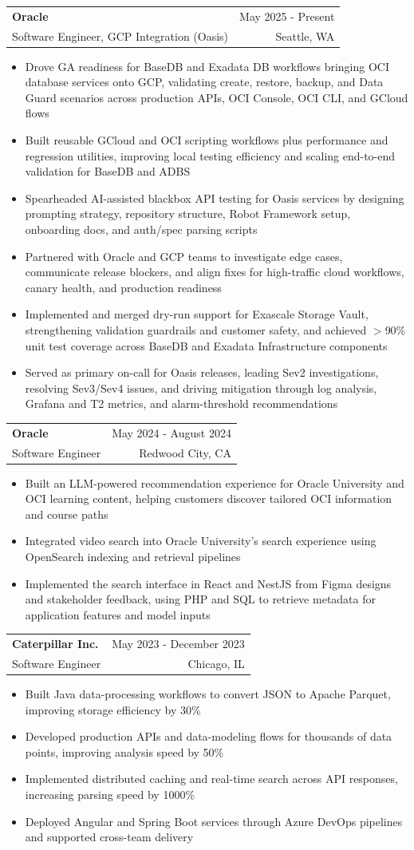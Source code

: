 \documentclass[letterpaper,11pt]{article}
\makeatletter
\newcommand{\resumeItem}[1]{
  \item\small{
    {#1 \vspace{-2pt}}
  }
}
\newcommand{\resumeSubheading}[4]{
  \vspace{-2pt}\item
    \begin{tabular*}{0.97\textwidth}[t]{l@{\extracolsep{\fill}}r}
      \textbf{#1} & #2 \\
      {\small#3} & {\small #4} \\
    \end{tabular*}\vspace{-7pt}
}
\newcommand{\resumeItemListStart}{\begin{itemize}}
\newcommand{\resumeItemListEnd}{\end{itemize}\vspace{-5pt}}
\makeatother
\begin{document}
    \resumeSubheading
  {Oracle}{May 2025 - Present}
  {Software Engineer, GCP Integration (Oasis)}{Seattle, WA}
  \resumeItemListStart
    \resumeItem{Drove GA readiness for BaseDB and Exadata DB workflows bringing OCI database services onto GCP, validating create, restore, backup, and Data Guard scenarios across production APIs, OCI Console, OCI CLI, and GCloud flows}
    \resumeItem{Built reusable GCloud and OCI scripting workflows plus performance and regression utilities, improving local testing efficiency and scaling end-to-end validation for BaseDB and ADBS}
    \resumeItem{Spearheaded AI-assisted blackbox API testing for Oasis services by designing prompting strategy, repository structure, Robot Framework setup, onboarding docs, and auth/spec parsing scripts}
    \resumeItem{Partnered with Oracle and GCP teams to investigate edge cases, communicate release blockers, and align fixes for high-traffic cloud workflows, canary health, and production readiness}
    \resumeItem{Implemented and merged dry-run support for Exascale Storage Vault, strengthening validation guardrails and customer safety, and achieved $>$90\% unit test coverage across BaseDB and Exadata Infrastructure components}
    \resumeItem{Served as primary on-call for Oasis releases, leading Sev2 investigations, resolving Sev3/Sev4 issues, and driving mitigation through log analysis, Grafana and T2 metrics, and alarm-threshold recommendations}
  \resumeItemListEnd

    \resumeSubheading
      {Oracle}{May 2024 - August 2024}
      {Software Engineer}{Redwood City, CA}
      \resumeItemListStart
        \resumeItem{Built an LLM-powered recommendation experience for Oracle University and OCI learning content, helping customers discover tailored OCI information and course paths}
        \resumeItem{Integrated video search into Oracle University's search experience using OpenSearch indexing and retrieval pipelines}
        \resumeItem{Implemented the search interface in React and NestJS from Figma designs and stakeholder feedback, using PHP and SQL to retrieve metadata for application features and model inputs}
      \resumeItemListEnd

    \resumeSubheading
      {Caterpillar Inc.}{May 2023 - December 2023}
      {Software Engineer}{Chicago, IL}
      \resumeItemListStart
        \resumeItem{Built Java data-processing workflows to convert JSON to Apache Parquet, improving storage efficiency by 30\%}
        \resumeItem{Developed production APIs and data-modeling flows for thousands of data points, improving analysis speed by 50\%}
        \resumeItem{Implemented distributed caching and real-time search across API responses, increasing parsing speed by 1000\%}
        \resumeItem{Deployed Angular and Spring Boot services through Azure DevOps pipelines and supported cross-team delivery}
      \resumeItemListEnd
\end{document}
